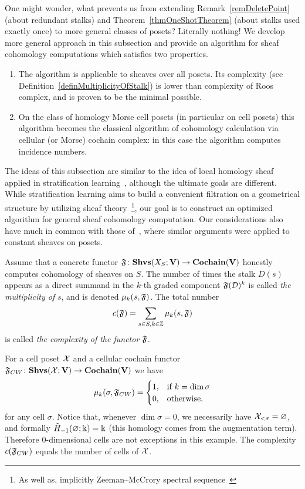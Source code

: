 One might wonder, what prevents us from extending Remark~\ref{remDeletePoint} (about redundant stalks) and Theorem~\ref{thmOneShotTheorem} (about stalks used exactly once) to more general classes of posets? Literally nothing! We develop more general approach in this subsection and provide an algorithm for sheaf cohomology computations which satisfies two properties.
\begin{enumerate}
  \item The algorithm is applicable to sheaves over all posets. Its complexity (see Definition~\ref{definMultiplicityOfStalk}) is lower than complexity of Roos complex, and is proven to be the minimal possible.
  \item On the class of homology Morse cell posets (in particular on cell posets) this algorithm becomes the classical algorithm of cohomology calculation via cellular (or Morse) cochain complex: in this case the algorithm computes incidence numbers.
\end{enumerate}
The ideas of this subsection are similar to the idea of local homology sheaf applied in stratification learning~\cite{brown2021sheaf}, although the ultimate goals are different. While stratification learning aims to build a convenient filtration on a geometrical structure by utilizing sheaf theory~\footnote{As well as, implicitly Zeeman--McCrory spectral sequence~\cite{McCrory}}, our goal is to construct an optimized algorithm for general sheaf cohomology computation. Our considerations also have much in common with those of~\cite{CIANCI20171}, where similar arguments were applied to constant sheaves on posets.

\begin{defin}\label{definMultiplicityOfStalk}
Assume that a concrete functor $\mathfrak{F}\colon \mathbf{Shvs}(X_S;\mathbf{V})\to\mathbf{Cochain}(\mathbf{V})$ honestly computes cohomology of sheaves on $S$. The number of times the stalk $D(s)$ appears as a direct summand in the $k$-th graded component $\mathfrak{F}(\mathcal{D})^k$ is called \emph{the multiplicity of} $s$, and is denoted $\mu_k(s,\mathfrak{F})$. The total number
\[
c(\mathfrak{F})=\sum_{s\in S, k\in\mathbb{Z}}\mu_k(s,\mathfrak{F})
\]
is called \emph{the complexity of the functor} $\mathfrak{F}$.
\end{defin}

\begin{ex}\label{exMultiplicityCW}
For a cell poset $\mathcal{X}$ and a cellular cochain functor $\mathfrak{F}_{CW}\colon \mathbf{Shvs}(\mathcal{X};\mathbf{V})\to\mathbf{Cochain}(\mathbf{V})$ we have
\[
\mu_k(\sigma,\mathfrak{F}_{CW})=\begin{cases}
                           1, & \mbox{if } k=\dim\sigma \\
                           0, & \mbox{otherwise}.
                         \end{cases}
\]
for any cell $\sigma$. Notice that, whenever $\dim\sigma=0$, we necessarily have $\mathcal{X}_{<\sigma}=\varnothing$, and formally $\tilde{H}_{-1}(\varnothing;\Bbbk)=\Bbbk$ (this homology comes from the augmentation term). Therefore $0$-dimensional cells are not exceptions in this example. The complexity $c(\mathfrak{F}_{CW})$ equals the number of cells of $\mathcal{X}$.
\end{ex}

